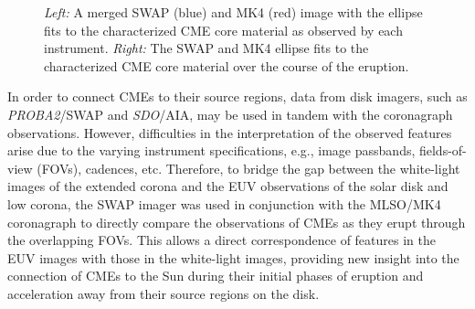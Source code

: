 \documentclass[preprint2]{aastex}
\begin{document}
\begin{figure}
\centering
{}
\label{front_mults}
\label{ell_front}
\caption{\emph{Left:} A merged SWAP (blue) and MK4 (red) image with the ellipse fits to the characterized CME core material as observed by each instrument. \emph{Right:} The SWAP and MK4 ellipse fits to the characterized CME core material over the course of the eruption.}
\label{mk4_swap_figs}
\end{figure}

In order to connect CMEs to their source regions, data from disk imagers, such as \emph{PROBA2}/SWAP and \emph{SDO}/AIA, may be used in tandem with the coronagraph observations. However, difficulties in the interpretation of the observed features arise due to the varying instrument specifications, e.g., image passbands, fields-of-view (FOVs), cadences, etc. Therefore, to bridge the gap between the white-light images of the extended corona and the EUV observations of the solar disk and low corona, the SWAP imager was used in conjunction with the MLSO/MK4 coronagraph to directly compare the observations of CMEs as they erupt through the overlapping FOVs. This allows a direct correspondence of features in the EUV images with those in the white-light images, providing new insight into the connection of CMEs to the Sun during their initial phases of eruption and acceleration away from their source regions on the disk.
\end{document}
